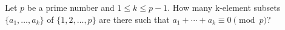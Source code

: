 Let $p$ be a prime number and $1 \le k \le p − 1$.
How many k-element subsets $\{a_1, \dots, a_k \}$ of $\{1, 2, \dots, p\}$ are there such that $a_1 + \cdots + a_k \equiv 0 \pmod{p}$?
